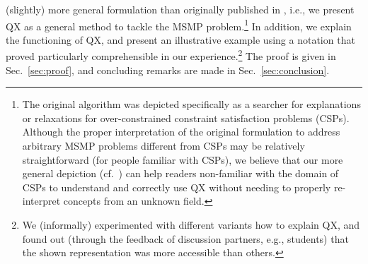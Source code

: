 \documentclass[]{elsarticle}
\begin{document}
	(slightly) more general formulation than originally published in \cite{junker04}, i.e., we present QX as a general method to tackle the MSMP problem.\footnote{The original algorithm was depicted specifically as a searcher for explanations or relaxations for over-constrained constraint satisfaction problems (CSPs). 
		Although the proper interpretation of the original formulation to address arbitrary MSMP problems different from CSPs may be relatively straightforward (for people familiar with CSPs), we believe that our more general depiction (cf.\ \cite{marques2013minimal}) can help readers non-familiar with the domain of CSPs to understand and correctly use QX without needing to properly re-interpret concepts from an unknown field.} 
	In addition, we explain the functioning of QX, and present an illustrative example using a notation that proved particularly comprehensible in our experience.\footnote{We (informally) experimented with different variants how to explain QX, and found out (through the feedback of discussion partners, e.g., students) that the shown representation was more accessible than others.} The proof is given in Sec.~\ref{sec:proof}, and concluding remarks are made in Sec.~\ref{sec:conclusion}.
	
	
	
	
	
	
\end{document}
